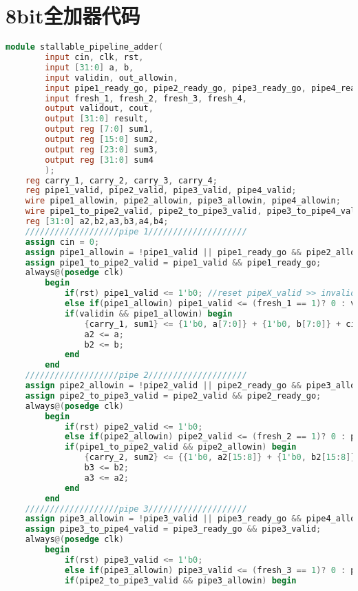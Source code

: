 \section{8bit全加器代码}
\begin{lstlisting}[language=Verilog]
    module stallable_pipeline_adder(
        input cin, clk, rst,
        input [31:0] a, b,
        input validin, out_allowin,
        input pipe1_ready_go, pipe2_ready_go, pipe3_ready_go, pipe4_ready_go,
        input fresh_1, fresh_2, fresh_3, fresh_4,
        output validout, cout,
        output [31:0] result,
        output reg [7:0] sum1,
        output reg [15:0] sum2,
        output reg [23:0] sum3,
        output reg [31:0] sum4
        );
    reg carry_1, carry_2, carry_3, carry_4;
    reg pipe1_valid, pipe2_valid, pipe3_valid, pipe4_valid;
    wire pipe1_allowin, pipe2_allowin, pipe3_allowin, pipe4_allowin;
    wire pipe1_to_pipe2_valid, pipe2_to_pipe3_valid, pipe3_to_pipe4_valid;
    reg [31:0] a2,b2,a3,b3,a4,b4;
    ///////////////////pipe 1////////////////////
    assign cin = 0;
    assign pipe1_allowin = !pipe1_valid || pipe1_ready_go && pipe2_allowin;
    assign pipe1_to_pipe2_valid = pipe1_valid && pipe1_ready_go;
    always@(posedge clk) 
        begin
            if(rst) pipe1_valid <= 1'b0; //reset pipeX_valid >> invalid
            else if(pipe1_allowin) pipe1_valid <= (fresh_1 == 1)? 0 : validin;
            if(validin && pipe1_allowin) begin 
                {carry_1, sum1} <= {1'b0, a[7:0]} + {1'b0, b[7:0]} + cin;
                a2 <= a;
                b2 <= b;
            end
        end
    ///////////////////pipe 2////////////////////
    assign pipe2_allowin = !pipe2_valid || pipe2_ready_go && pipe3_allowin;
    assign pipe2_to_pipe3_valid = pipe2_valid && pipe2_ready_go;
    always@(posedge clk)
        begin
            if(rst) pipe2_valid <= 1'b0;
            else if(pipe2_allowin) pipe2_valid <= (fresh_2 == 1)? 0 : pipe1_to_pipe2_valid;
            if(pipe1_to_pipe2_valid && pipe2_allowin) begin
                {carry_2, sum2} <= {{1'b0, a2[15:8]} + {1'b0, b2[15:8]} + carry_1, sum1};
                b3 <= b2;
                a3 <= a2;
            end
        end
    ///////////////////pipe 3////////////////////
    assign pipe3_allowin = !pipe3_valid || pipe3_ready_go && pipe4_allowin;
    assign pipe3_to_pipe4_valid = pipe3_ready_go && pipe3_valid;
    always@(posedge clk)
        begin
            if(rst) pipe3_valid <= 1'b0;
            else if(pipe3_allowin) pipe3_valid <= (fresh_3 == 1)? 0 : pipe2_to_pipe3_valid;
            if(pipe2_to_pipe3_valid && pipe3_allowin) begin

\end{lstlisting}
